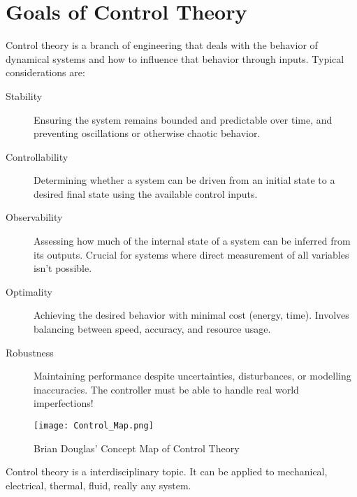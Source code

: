 \documentclass[../notes.tex]{subfiles}
\begin{document}
\section{Goals of Control Theory}
Control theory is a branch of engineering that deals with the behavior of dynamical systems and how to influence that behavior through inputs. Typical considerations are:
\begin{description}
    \item[Stability] Ensuring the system remains bounded and predictable over time, and preventing oscillations or otherwise chaotic behavior.
    \item[Controllability] Determining whether a system can be driven from an initial state to a desired final state using the available control inputs.
    \item[Observability] Assessing how much of the internal state of a system can be inferred from its outputs. Crucial for systems where direct measurement of all variables isn't possible.
    \item[Optimality] Achieving the desired behavior with minimal cost (energy, time). Involves balancing between speed, accuracy, and resource usage.
    \item[Robustness] Maintaining performance despite uncertainties, disturbances, or modelling inaccuracies. The controller must be able to handle real world imperfections!
\end{description}

\begin{figure}[H]
    \centering
    \texttt{[image: Control\_Map.png]}
    \caption{Brian Douglas' Concept Map of Control Theory}
    \label{fig:controlMap}
\end{figure}

Control theory is a interdisciplinary topic. It can be applied to mechanical, electrical, thermal, fluid, really any system.
\end{document}
